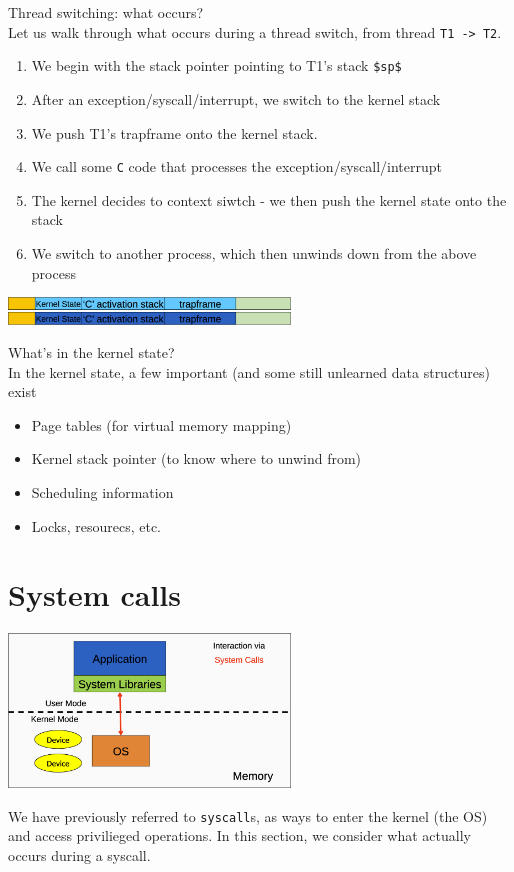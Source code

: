 \documentclass[journal, letterpaper]{IEEEtran}
\begin{document}
\begin{aside}{Thread switching: what occurs?} \\
    Let us walk through what occurs during a thread switch, from thread \verb|T1 -> T2|.
    \begin{enumerate}
        \item We begin with the stack pointer pointing to T1's stack \verb|$sp$|
        \item After an exception/syscall/interrupt, we switch to the kernel stack
        \item We push T1's trapframe onto the kernel stack.
        \item We call some \verb|C| code that processes the exception/syscall/interrupt
        \item The kernel decides to context siwtch - we then push the kernel state onto the stack
        \item We switch to another process, which then unwinds down from the above process
    \end{enumerate}
    \begin{center}
        \includegraphics[width=7.5cm]{./photos/thread_switch.png}
    \end{center}
\end{aside}
\begin{example}{What's in the kernel state?} \\
    In the kernel state, a few important (and some still unlearned data structures) exist
    \begin{itemize}
        \item Page tables (for virtual memory mapping)
        \item Kernel stack pointer (to know where to unwind from)
        \item Scheduling information
        \item Locks, resourecs, etc.
    \end{itemize}
\end{example}
\section{System calls}
\begin{center}
    \includegraphics[width=7.5cm]{./photos/syscall_system.png}
\end{center}
We have previously referred to \verb|syscall|s, as ways to enter the kernel (the OS) and access privilieged operations. In this section, we consider what actually occurs during a syscall.
\end{document}

